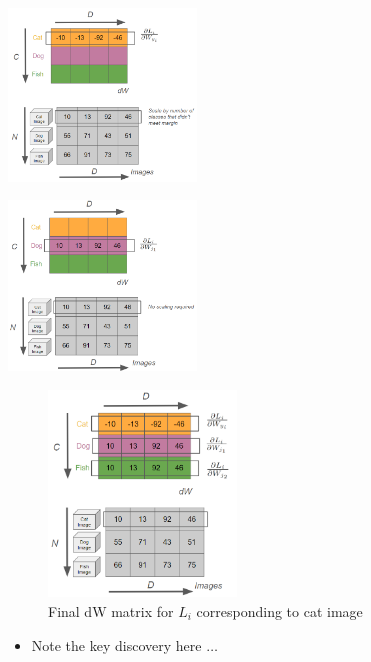 \documentclass{article}
\begin{document}
\begin{minipage}[t]{0.5\textwidth}
    \centering
    \includegraphics[width=5cm, scale=1]{images/toy1.PNG}
    \captionsetup{justification=centering}
\end{minipage}%
\begin{minipage}[t]{0.5\textwidth}
    \centering
    \includegraphics[width=5cm, scale=1]{images/toy2.PNG}
    \captionsetup{justification=centering}
\end{minipage}%

\begin{figure}[htp]
    \centering
    \includegraphics[width=5cm, scale=1]{images/toy3.PNG}
    \captionsetup{justification=centering}
    \caption{Final dW matrix for $L_{i}$ corresponding to cat image}
\end{figure}

\newpage
\begin{itemize}
    \item Note the key discovery here $\dots$
\end{itemize}
\end{document}
